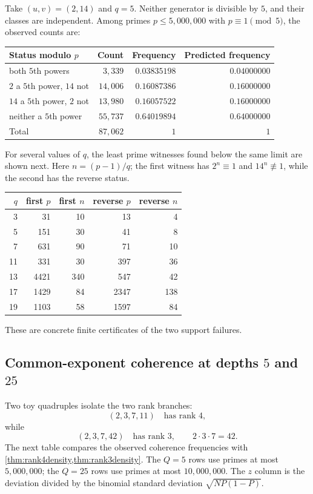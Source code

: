 \documentclass[11pt]{article}
\theoremstyle{definition}
\theoremstyle{remark}
\begin{document}
Take $(u,v)=(2,14)$ and $q=5$.  Neither generator is divisible by $5$, and their classes are
independent.  Among primes $p\le5{,}000{,}000$ with $p\equiv1\pmod5$, the observed counts are:
\begin{center}
\begin{tabular}{lrrr}
\toprule
Status modulo $p$ & Count & Frequency & Predicted frequency\\
\midrule
both $5$th powers & $3{,}339$ & $0.03835198$ & $0.04000000$\\
$2$ a $5$th power, $14$ not & $14{,}006$ & $0.16087386$ & $0.16000000$\\
$14$ a $5$th power, $2$ not & $13{,}980$ & $0.16057522$ & $0.16000000$\\
neither a $5$th power & $55{,}737$ & $0.64019894$ & $0.64000000$\\
\midrule
Total & $87{,}062$ & $1$ & $1$\\
\bottomrule
\end{tabular}
\end{center}

For several values of $q$, the least prime witnesses found below the same limit are shown next.
Here $n=(p-1)/q$; the first witness has $2^n\equiv1$ and $14^n\not\equiv1$, while the second
has the reverse status.
\begin{center}
\begin{tabular}{rrrrr}
\toprule
$q$ & first $p$ & first $n$ & reverse $p$ & reverse $n$\\
\midrule
3  & 31   & 10  & 13   & 4\\
5  & 151  & 30  & 41   & 8\\
7  & 631  & 90  & 71   & 10\\
11 & 331  & 30  & 397  & 36\\
13 & 4421 & 340 & 547  & 42\\
17 & 1429 & 84  & 2347 & 138\\
19 & 1103 & 58  & 1597 & 84\\
\bottomrule
\end{tabular}
\end{center}
These are concrete finite certificates of the two support failures.

\subsection{Common-exponent coherence at depths \texorpdfstring{$5$ and $25$}{5 and 25}}

Two toy quadruples isolate the two rank branches:
\[
       (2,3,7,11)\quad\text{has rank }4,
\]
while
\[
       (2,3,7,42)\quad\text{has rank }3,
       \qquad 2\cdot3\cdot7=42.
\]
The next table compares the observed coherence frequencies with
\cref{thm:rank4density,thm:rank3density}.  The $Q=5$ rows use primes at most $5{,}000{,}000$;
the $Q=25$ rows use primes at most $10{,}000{,}000$.  The $z$ column is the deviation divided
by the binomial standard deviation $\sqrt{NP(1-P)}$.
\end{document}
